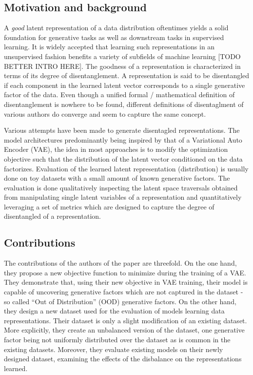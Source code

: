 \documentclass[twoside,11pt]{article}
\begin{document}
\subsection{Motivation and background}
A \textit{good} latent representation of a data distribution oftentimes yields a solid foundation for generative tasks as well as downstream tasks in supervised learning. It is widely accepted that learning such representations in an unsupervised fashion benefits a variety of subfields of machine learning [TODO BETTER INTRO HERE].
The goodness of a representation is characterized in terms of its degree of disentanglement. A representation is said to be disentangled if each component in the learned latent vector corresponds to a single generative factor of the data. Even though a unified formal / mathematical definition of disentanglement is nowhere to be found, different definitions of disentaglment of various authors do converge and seem to capture the same concept.

Various attempts have been made to generate disentagled representations. The model architectures predominantly being inspired by that of a Variational Auto Encoder (VAE), the idea in most approaches is to modify the optimization objective such that the distribution of the latent vector conditioned on the data factorizes.
Evaluation of the learned latent representation (distribution) is usually done on toy datasets with a small amount of known generative factors. The evaluation is done qualitatively inspecting the latent space traversals obtained from manipulating single latent variables of a representation and quantitatively leveraging a set of metrics which are designed to capture the degree of disentangled of a representation.

\subsection{Contributions}
The contributions of the authors of the paper are threefold. On the one hand, they propose a new objective function to minimize during the training of a VAE.
They demonstrate that, using their new objective in VAE training, their model is capable of uncovering generative factors which are not captured in the dataset - so called \enquote{Out of Distribution} (OOD) generative factors.
On the other hand, they design a new dataset used for the evaluation of models learning data representations. Their dataset is only a slight modification of an existing dataset. More explicitly, they create an unbalanced version of the dataset, one generative factor being not uniformly distributed over the dataset as is common in the existing datasets.
Moreover, they evaluate existing models on their newly designed dataset, examining the effects of the disbalance on the representations learned.
\end{document}
